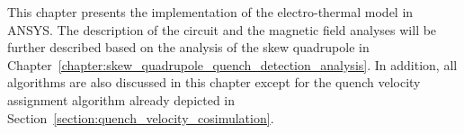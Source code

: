 This chapter presents the implementation of the electro-thermal model in ANSYS. The description of the circuit and the magnetic field analyses will be further described based on the analysis of the skew quadrupole in Chapter~\ref{chapter:skew_quadrupole_quench_detection_analysis}. In addition, all algorithms are also discussed in this chapter except for the quench velocity assignment algorithm already depicted in Section~\ref{section:quench_velocity_cosimulation}.